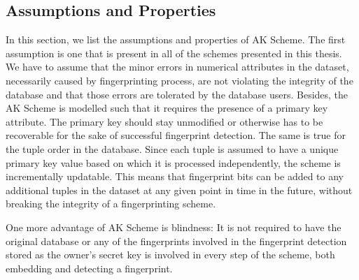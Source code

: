 \subsection{Assumptions and Properties}
In this section, we list the assumptions and properties of AK Scheme. 
The first assumption is one that is present in all of the schemes presented in this thesis. 
We have to assume that the minor errors in numerical attributes in the dataset, necessarily caused by fingerprinting process, are not violating the integrity of the database and that those errors are tolerated by the database users. 
Besides, the AK Scheme is modelled such that it requires the presence of a primary key attribute. 
The primary key should stay unmodified or otherwise has to be recoverable for the sake of successful fingerprint detection.
The same is true for the tuple order in the database.
Since each tuple is assumed to have a unique primary key value based on which it is processed independently, the scheme is incrementally updatable. 
This means that fingerprint bits can be added to any additional tuples in the dataset at any given point in time in the future, without breaking the integrity of a fingerprinting scheme.

One more advantage of AK Scheme is blindness: It is not required to have the original database or any of the fingerprints involved in the fingerprint detection stored as the owner's secret key is involved in every step of the scheme, both embedding and detecting a fingerprint. 
